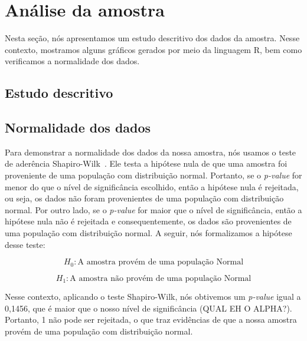 \section{An\'alise da amostra}
\label{sec:analise}

Nesta seção, nós apresentamos um estudo descritivo dos dados da amostra. Nesse contexto, mostramos alguns gráficos gerados por meio da linguagem R, bem como verificamos a normalidade dos dados.

\subsection{Estudo descritivo}
\label{sec:estudo}


\subsection{Normalidade dos dados}
\label{sec:normalidade}


Para demonstrar a normalidade dos dados da nossa amostra, nós usamos o teste de aderência Shapiro-Wilk~\cite{shapirowilk}. Ele testa a hipótese nula de que uma amostra foi proveniente de uma população com distribuição normal. Portanto, se o \emph{p-value} for menor do que o nível de significância escolhido, então a hipótese nula é rejeitada, ou seja, os dados não foram provenientes de uma população com distribuição normal. Por outro lado, se o \emph{p-value} for maior que o nível de significância, então a hipótese nula não é rejeitada e consequentemente, os dados são provenientes de uma população com distribuição normal. A seguir, nós formalizamos a hipótese desse teste:

\begin{equation}
	H_{0} : \text{A amostra provém de uma população Normal}
\end{equation}

\begin{equation}
	H_{1} : \text{A amostra não provém de uma população Normal}
\end{equation}

Nesse contexto, aplicando o teste Shapiro-Wilk, nós obtivemos um \emph{p-value} igual a 0,1456, que é maior que o nosso nível de significância (QUAL EH O ALPHA?). Portanto, 1 não pode ser rejeitada, o que traz evidências de que a nossa amostra provém de uma população com distribuição normal.

